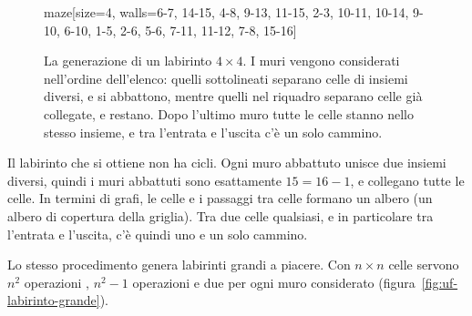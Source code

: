 \begin{figure}[htbp]
\begin{widget}{maze}[size=4, walls={6-7, 14-15, 4-8, 9-13, 11-15, 2-3, 10-11, 10-14, 9-10, 6-10, 1-5, 2-6, 5-6, 7-11, 11-12, 7-8, 15-16}]
\end{widget}
\caption{La generazione di un labirinto $4 \times 4$. I muri vengono considerati nell'ordine dell'elenco: quelli sottolineati separano celle di insiemi diversi, e si abbattono, mentre quelli nel riquadro separano celle già collegate, e restano. Dopo l'ultimo muro tutte le celle stanno nello stesso insieme, e tra l'entrata e l'uscita c'è un solo cammino.}
\label{fig:uf-labirinto}
\end{figure}

Il labirinto che si ottiene non ha cicli. Ogni muro abbattuto unisce due insiemi diversi, quindi i muri abbattuti sono esattamente $15 = 16 - 1$, e collegano tutte le celle. In termini di grafi, le celle e i passaggi tra celle formano un albero (un albero di copertura della griglia). Tra due celle qualsiasi, e in particolare tra l'entrata e l'uscita, c'è quindi uno e un solo cammino.

Lo stesso procedimento genera labirinti grandi a piacere. Con $n \times n$ celle servono $n^2$ operazioni \MakeSet{}, $n^2 - 1$ operazioni \Union{} e due \FindSet{} per ogni muro considerato (figura~\ref{fig:uf-labirinto-grande}).

